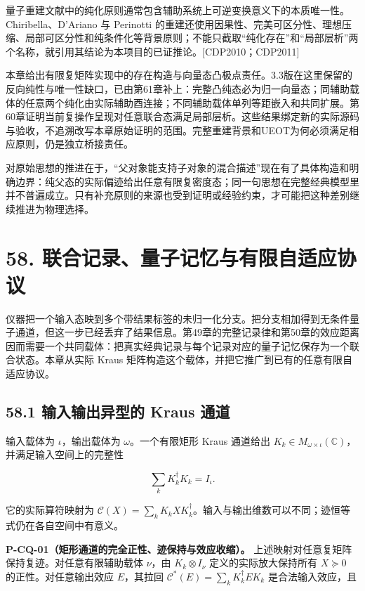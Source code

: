 \documentclass[
  11pt,
  oneside]{book}
\begin{document}
量子重建文献中的纯化原则通常包含辅助系统上可逆变换意义下的本质唯一性。Chiribella、D'Ariano
与 Perinotti
的重建还使用因果性、完美可区分性、理想压缩、局部可区分性和纯条件化等背景原则；不能只截取``纯化存在''和``局部层析''两个名称，就引用其结论为本项目的已证推论。{[}CDP2010；CDP2011{]}

本章给出有限复矩阵实现中的存在构造与向量态凸极点责任。3.3版在这里保留的反向纯性与唯一性缺口，已由第61章补上：完整凸纯态必为归一向量态；同辅助载体的任意两个纯化由实际辅助酉连接；不同辅助载体单列等距嵌入和共同扩展。第60章证明当前复操作呈现对任意联合态满足局部层析。这些结果绑定新的实际源码与验收，不追溯改写本章原始证明的范围。完整重建背景和UEOT为何必须满足相应原则，仍是独立桥接责任。

对原始思想的推进在于，``父对象能支持子对象的混合描述''现在有了具体构造和明确边界：纯父态的实际偏迹给出任意有限复密度态；同一句思想在完整经典模型里并不普遍成立。只有补充原则的来源也受到证明或经验约束，才可能把这种差别继续推进为物理选择。

\hypertarget{ch-58}{%
\chapter{58. 联合记录、量子记忆与有限自适应协议}\label{ch-58}}

仪器把一个输入态映到多个带结果标签的未归一化分支。把分支相加得到无条件量子通道，但这一步已经丢弃了结果信息。第49章的完整记录律和第50章的效应距离因而需要一个共同载体：把真实经典记录与每个记录对应的量子记忆保存为一个联合状态。本章从实际
Kraus 矩阵构造这个载体，并把它推广到已有的任意有限自适应协议。

\hypertarget{ux8f93ux5165ux8f93ux51faux5f02ux578bux7684-kraus-ux901aux9053}{%
\section{58.1 输入输出异型的 Kraus
通道}\label{ux8f93ux5165ux8f93ux51faux5f02ux578bux7684-kraus-ux901aux9053}}

输入载体为 \(\iota\)，输出载体为 \(\omega\)。一个有限矩形 Kraus 通道给出
\(K_k\in M_{\omega\times\iota}(\mathbb C)\)，并满足输入空间上的完整性

\[
\sum_kK_k^\dagger K_k=I_\iota.
\]

它的实际算符映射为
\(\mathcal C(X)=\sum_kK_kXK_k^\dagger\)。输入与输出维数可以不同；迹恒等式仍在各自空间中有意义。

\protect\hypertarget{p-cq-01}{}{}

\textbf{P-CQ-01（矩形通道的完全正性、迹保持与效应收缩）。}
上述映射对任意复矩阵保持复迹。对任意有限辅助载体 \(\nu\)，由
\(K_k\otimes I_\nu\) 定义的实际放大保持所有 \(X\succeq0\)
的正性。对任意输出效应 \(E\)，其拉回
\(\mathcal C^*(E)=\sum_kK_k^\dagger E K_k\) 是合法输入效应，且
\end{document}
